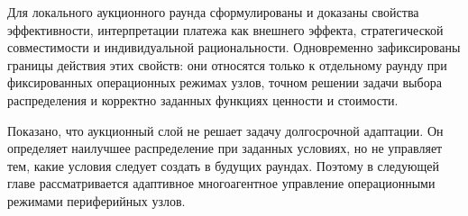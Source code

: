 Для локального аукционного раунда сформулированы и доказаны свойства эффективности, интерпретации платежа как внешнего эффекта, стратегической совместимости и индивидуальной рациональности. Одновременно зафиксированы границы действия этих свойств: они относятся только к отдельному раунду при фиксированных операционных режимах узлов, точном решении задачи выбора распределения и корректно заданных функциях ценности и стоимости.

Показано, что аукционный слой не решает задачу долгосрочной адаптации. Он определяет наилучшее распределение при заданных условиях, но не управляет тем, какие условия следует создать в будущих раундах. Поэтому в следующей главе рассматривается адаптивное многоагентное управление операционными режимами периферийных узлов.
